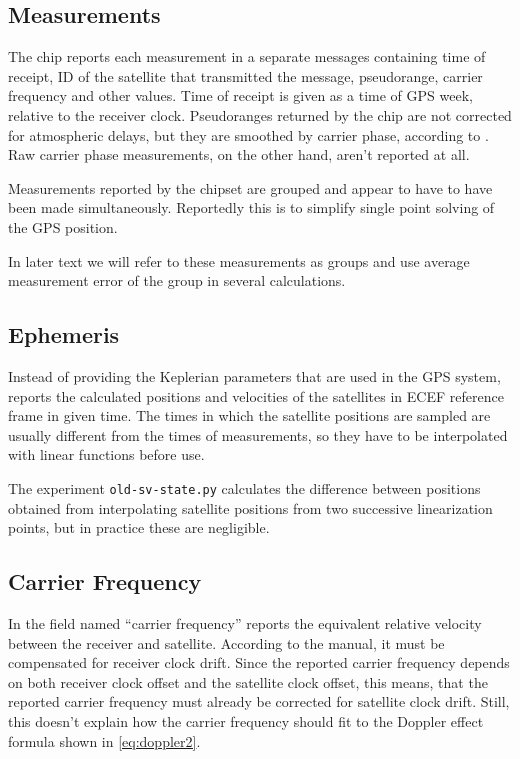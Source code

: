 \subsection{Measurements}
\label{sec:impl-sirf-measurements}
The \sirf chip reports each measurement in a separate messages containing
time of receipt, ID of the satellite that transmitted the message, pseudorange,
carrier frequency and other values.
Time of receipt is given as a time of GPS week, relative to the receiver clock.
Pseudoranges returned by the \sirf chip are not corrected for atmospheric delays,
but they are smoothed by carrier phase, according to \cite{sirf-protocol}.
Raw carrier phase measurements, on the other hand, aren't reported at all.

Measurements reported by the chipset are grouped and appear
to have to have been made simultaneously.
Reportedly this is to simplify single point solving of the GPS position.

In later text we will refer to these measurements as groups and use average
measurement error of the group in several calculations.

\subsection{Ephemeris}
\label{sec:impl-sirf-ephemeris}
Instead of providing the Keplerian parameters that are used in the GPS system,
\sirf reports the calculated positions and velocities of the satellites in ECEF
reference frame in given time.
The times in which the satellite positions are sampled are usually different
from the times of measurements, so they have to be interpolated with linear functions
before use.

The experiment \verb=old-sv-state.py= calculates the difference between positions
obtained from interpolating satellite positions from two successive linearization points, but in
practice these are negligible.

\subsection{Carrier Frequency}
\label{sec:impl-carrier-freq}
In the field named \enquote{carrier frequency} \sirf reports the equivalent relative velocity
between the receiver and satellite.
According to the manual, it must be compensated for receiver clock drift.
Since the reported carrier frequency depends on both receiver clock offset and 
the satellite clock offset, this means, that the reported carrier frequency must already
be corrected for satellite clock drift.
Still, this doesn't explain how the carrier frequency should fit to the Doppler
effect formula shown in \cref{eq:doppler2}.

